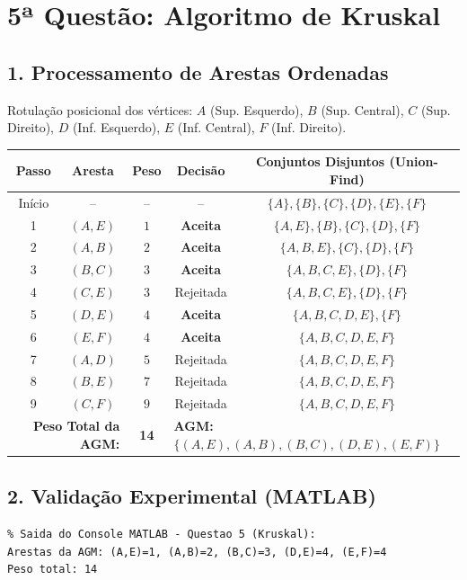 \documentclass[11pt, a4paper]{article}
\begin{document}
\vspace{0.2cm}

\section*{5ª Questão: Algoritmo de Kruskal}

\subsection*{1. Processamento de Arestas Ordenadas}
Rotulação posicional dos vértices: $A$ (Sup. Esquerdo), $B$ (Sup. Central), $C$ (Sup. Direito), $D$ (Inf. Esquerdo), $E$ (Inf. Central), $F$ (Inf. Direito).

\begin{center}
\begin{tabular}{ccccc}
\toprule
\textbf{Passo} & \textbf{Aresta} & \textbf{Peso} & \textbf{Decisão} & \textbf{Conjuntos Disjuntos (Union-Find)} \\
\midrule
Início & -- & -- & -- & $\{A\}, \{B\}, \{C\}, \{D\}, \{E\}, \{F\}$ \\
1 & $(A, E)$ & $1$ & \textbf{Aceita} & $\{A, E\}, \{B\}, \{C\}, \{D\}, \{F\}$ \\
2 & $(A, B)$ & $2$ & \textbf{Aceita} & $\{A, B, E\}, \{C\}, \{D\}, \{F\}$ \\
3 & $(B, C)$ & $3$ & \textbf{Aceita} & $\{A, B, C, E\}, \{D\}, \{F\}$ \\
4 & $(C, E)$ & $3$ & Rejeitada & $\{A, B, C, E\}, \{D\}, \{F\}$ \\
5 & $(D, E)$ & $4$ & \textbf{Aceita} & $\{A, B, C, D, E\}, \{F\}$ \\
6 & $(E, F)$ & $4$ & \textbf{Aceita} & $\{A, B, C, D, E, F\}$ \\
7 & $(A, D)$ & $5$ & Rejeitada & $\{A, B, C, D, E, F\}$ \\
8 & $(B, E)$ & $7$ & Rejeitada & $\{A, B, C, D, E, F\}$ \\
9 & $(C, F)$ & $9$ & Rejeitada & $\{A, B, C, D, E, F\}$ \\
\midrule
\multicolumn{2}{r}{\textbf{Peso Total da AGM:}} & \textbf{14} & \multicolumn{2}{l}{\textbf{AGM:} $\{(A,E), (A,B), (B,C), (D,E), (E,F)\}$} \\
\bottomrule
\end{tabular}
\end{center}

\subsection*{2. Validação Experimental (MATLAB)}
\begin{lstlisting}
% Saida do Console MATLAB - Questao 5 (Kruskal):
Arestas da AGM: (A,E)=1, (A,B)=2, (B,C)=3, (D,E)=4, (E,F)=4
Peso total: 14
\end{lstlisting}
\end{document}
